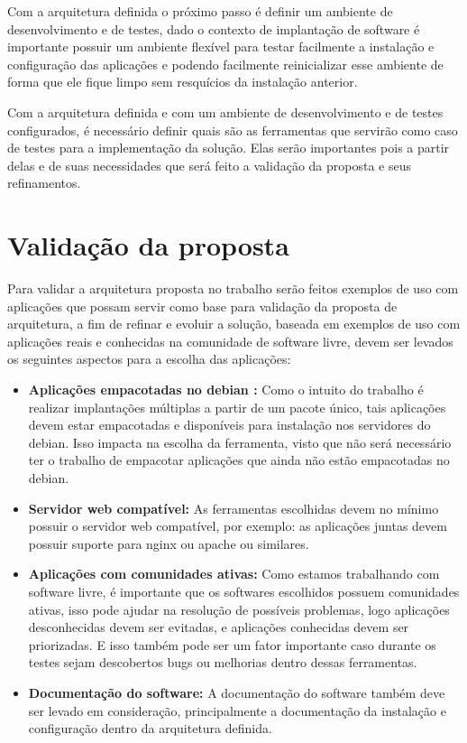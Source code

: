 Com a arquitetura definida o próximo passo é definir um ambiente de desenvolvimento e de
testes, dado o contexto de implantação de software é importante possuir um ambiente flexível para
testar facilmente a instalação e configuração das aplicações e podendo facilmente
reinicializar esse ambiente de forma que ele fique limpo sem resquícios da instalação
anterior.

Com a arquitetura definida e com um ambiente de desenvolvimento e de testes configurados, é
necessário definir quais são as ferramentas que servirão como caso de testes
para a implementação da solução. Elas serão importantes pois a partir delas
e de suas necessidades que será feito a validação da proposta e seus refinamentos.

\section{Validação da proposta}

Para validar a arquitetura proposta no trabalho serão feitos exemplos de uso com aplicações
que possam servir como base para validação da proposta de arquitetura, a fim de
refinar e evoluir a solução, baseada em exemplos de uso com aplicações reais e conhecidas
na comunidade de software livre, devem ser levados os seguintes aspectos para a
escolha das aplicações:

\begin{itemize}
  \item  \textbf{Aplicações empacotadas no debian :}  Como o intuito do trabalho
  é realizar implantações múltiplas a partir de um pacote único, tais aplicações
  devem estar empacotadas e disponíveis para instalação nos servidores do debian.
  Isso impacta na escolha da ferramenta, visto que não será necessário ter o trabalho
  de empacotar aplicações que ainda não estão empacotadas no debian.
  \item  \textbf{Servidor web compatível:} As ferramentas escolhidas devem no
  mínimo possuir o servidor web compatível, por exemplo: as aplicações juntas
  devem possuir suporte para nginx ou apache ou similares.
  \item  \textbf{Aplicações com comunidades ativas:} Como estamos trabalhando
  com software livre, é importante que os softwares escolhidos possuem comunidades
  ativas, isso pode ajudar na resolução de  possíveis problemas, logo aplicações
  desconhecidas devem ser evitadas, e aplicações conhecidas devem ser priorizadas.
  E isso também pode ser um fator importante caso durante os testes sejam descobertos
  bugs ou melhorias dentro dessas ferramentas.
  \item  \textbf{Documentação do software:} A documentação do software também deve
  ser levado em consideração, principalmente a documentação da instalação e configuração
  dentro da arquitetura definida.
\end{itemize}

